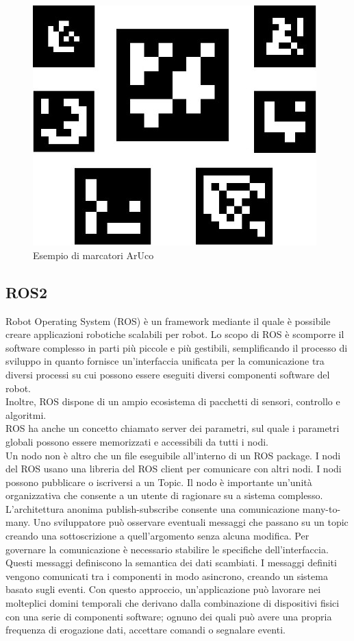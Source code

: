\\
\\
\begin{figure} [H]
    \centering
    \includegraphics[width=0.5\linewidth]{img/ArUco.jpeg}
    \caption{Esempio di marcatori ArUco}
    \label{fig:ArUco}
\end{figure}

\subsection{ROS2}
Robot Operating System (ROS)\cite{ROS2} \cite{RobOpeSys} è un framework mediante il quale è possibile creare applicazioni robotiche scalabili per robot. Lo scopo di ROS è scomporre il software complesso in parti più piccole e più gestibili, semplificando il processo di sviluppo in quanto fornisce un'interfaccia unificata per la comunicazione tra diversi processi su cui possono essere eseguiti diversi componenti software del robot.\\ 
Inoltre, ROS dispone di un ampio ecosistema di pacchetti di sensori, controllo e algoritmi.\\
ROS ha anche un concetto chiamato server dei parametri, sul quale i parametri globali possono essere memorizzati e accessibili da tutti i nodi. \\
Un nodo non è altro che un file eseguibile all'interno di un ROS package. I nodi del ROS usano una libreria del ROS client per comunicare con altri nodi. I nodi possono pubblicare o iscriversi a un Topic. 
Il nodo è importante un'unità organizzativa che consente a un utente di ragionare su a sistema complesso. L'architettura anonima publish-subscribe consente una comunicazione many-to-many. Uno sviluppatore può osservare eventuali messaggi che passano su un topic creando una sottoscrizione a quell'argomento senza alcuna modifica.
Per governare la comunicazione è necessario stabilire le specifiche dell'interfaccia. Questi messaggi definiscono la
semantica dei dati scambiati. I messaggi definiti vengono comunicati
tra i componenti in modo asincrono, creando un sistema basato sugli eventi. Con questo approccio, un'applicazione può
lavorare nei molteplici domini temporali che derivano dalla combinazione di dispositivi fisici con una serie di componenti software;
ognuno dei quali può avere una propria frequenza di erogazione
dati, accettare comandi o segnalare eventi.

